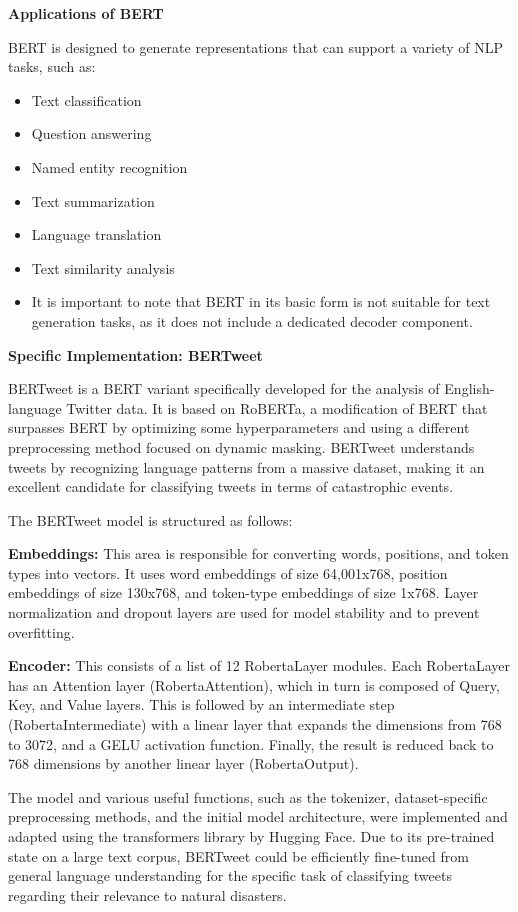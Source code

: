 \documentclass[10pt,table]{article}
\begin{document}
\textbf{Applications of BERT}

BERT is designed to generate representations that can support a variety of NLP tasks, such as:
\begin{itemize}
    \item Text classification
    \item Question answering
    \item Named entity recognition
    \item Text summarization
    \item Language translation
    \item Text similarity analysis
    \item It is important to note that BERT in its basic form is not suitable for text generation tasks, as it does not include a dedicated decoder component.
\end{itemize}

\textbf{Specific Implementation: BERTweet}

BERTweet is a BERT variant specifically developed for the analysis of English-language Twitter data. It is based on RoBERTa, a modification of BERT that surpasses BERT by optimizing some hyperparameters and using a different preprocessing method focused on dynamic masking. BERTweet understands tweets by recognizing language patterns from a massive dataset, making it an excellent candidate for classifying tweets in terms of catastrophic events.

The BERTweet model is structured as follows:

\textbf{Embeddings:} This area is responsible for converting words, positions, and token types into vectors. It uses word embeddings of size 64,001x768, position embeddings of size 130x768, and token-type embeddings of size 1x768. Layer normalization and dropout layers are used for model stability and to prevent overfitting.

\textbf{Encoder:} This consists of a list of 12 RobertaLayer modules. Each RobertaLayer has an Attention layer (RobertaAttention), which in turn is composed of Query, Key, and Value layers. This is followed by an intermediate step (RobertaIntermediate) with a linear layer that expands the dimensions from 768 to 3072, and a GELU activation function. Finally, the result is reduced back to 768 dimensions by another linear layer (RobertaOutput).


The model and various useful functions, such as the tokenizer, dataset-specific preprocessing methods, and the initial model architecture, were implemented and adapted using the transformers library by Hugging Face. Due to its pre-trained state on a large text corpus, BERTweet could be efficiently fine-tuned from general language understanding for the specific task of classifying tweets regarding their relevance to natural disasters.
\end{document}
